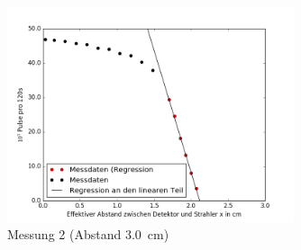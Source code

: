  \begin{figure}[h!]
 	\centering
 	\includegraphics[width=0.75\textwidth]{build/pulse2.png}
 	\caption{Messung 2 (Abstand \SI{3,0}{\centi\meter})}
 	\label{fig:pulse2}
 \end{figure}
 
 \clearpage
 
 
 
 
 



